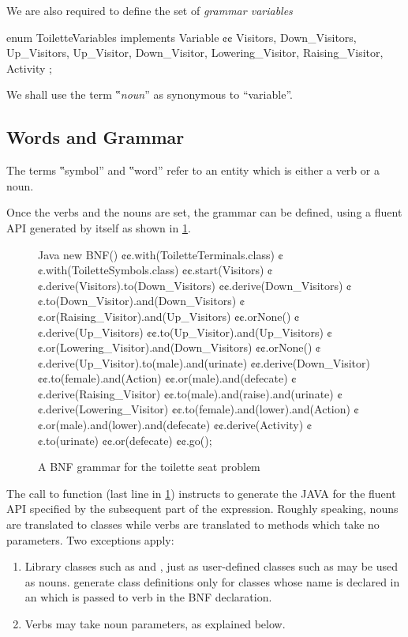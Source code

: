 We are also required to define the set of \emph{grammar variables}
\begin{JAVA}
enum ToiletteVariables implements Variable {¢¢
  Visitors, Down_Visitors, Up_Visitors,
  Up_Visitor, Down_Visitor,
  Lowering_Visitor, Raising_Visitor,
  Activity
};
\end{JAVA}
  We shall use the term ‟\emph{noun}” as synonymous to ``variable''.

\subsection{Words and Grammar}
The terms ‟symbol” and ‟word” refer to an entity which is either
  a verb or a noun.

Once the verbs and the nouns are set, the grammar can be defined,
  using a fluent API generated by \Self itself as shown
  in \cref{Figure:fluent}.

  \begin{figure}
  \begin{Code}{Java}
new BNF()
  ¢¢.with(ToiletteTerminals.class)
  ¢¢.with(ToiletteSymbols.class)
  ¢¢.start(Visitors)
  ¢¢.derive(Visitors).to(Down_Visitors)
  ¢¢.derive(Down_Visitors)
    ¢¢.to(Down_Visitor).and(Down_Visitors)
    ¢¢.or(Raising_Visitor).and(Up_Visitors)
    ¢¢.orNone()
  ¢¢.derive(Up_Visitors)
    ¢¢.to(Up_Visitor).and(Up_Visitors)
    ¢¢.or(Lowering_Visitor).and(Down_Visitors)
    ¢¢.orNone()
  ¢¢.derive(Up_Visitor).to(male).and(urinate)
  ¢¢.derive(Down_Visitor)
    ¢¢.to(female).and(Action)
    ¢¢.or(male).and(defecate)
  ¢¢.derive(Raising_Visitor)
    ¢¢.to(male).and(raise).and(urinate)
  ¢¢.derive(Lowering_Visitor)
    ¢¢.to(female).and(lower).and(Action)
    ¢¢.or(male).and(lower).and(defecate)
  ¢¢.derive(Activity)
    ¢¢.to(urinate)
    ¢¢.or(defecate)
  ¢¢.go();
  \end{Code}
  \caption{A BNF grammar for the toilette seat problem}
  \label{Figure:fluent}
\end{figure}

The call to function  (last line in \cref{Figure:fluent}) instructs
  \Self to generate the JAVA for the fluent API specified by the
  subsequent part of the expression.
Roughly speaking, nouns are translated to classes while verbs are translated to methods which
  take no parameters.
Two exceptions apply:
\begin{enumerate}
  \item 
    Library classes such as  and , just as user-defined
    classes such as  may be used as nouns. 
    \Self generate class definitions only for classes whose name is declared 
    in an  which is passed to  verb in the BNF declaration.
  \item Verbs may take noun parameters, as explained below.
\end{enumerate}
